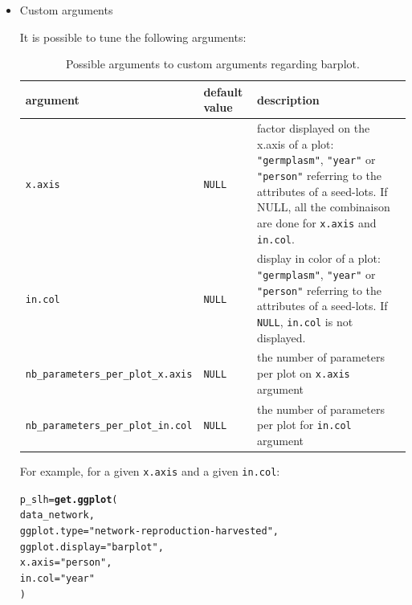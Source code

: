 \documentclass{article}\usepackage[]{graphicx}\usepackage[]{color}
\makeatletter
\newcommand{\hlstr}[1]{\textcolor[rgb]{0.192,0.494,0.8}{#1}}%
\newcommand{\hlstd}[1]{\textcolor[rgb]{0.345,0.345,0.345}{#1}}%
\newcommand{\hlkwb}[1]{\textcolor[rgb]{0.69,0.353,0.396}{#1}}%
\newcommand{\hlkwc}[1]{\textcolor[rgb]{0.333,0.667,0.333}{#1}}%
\newcommand{\hlkwd}[1]{\textcolor[rgb]{0.737,0.353,0.396}{\textbf{#1}}}%
\newenvironment{kframe}{%
 \def\at@end@of@kframe{}%
 \ifinner\ifhmode%
  \def\at@end@of@kframe{\end{minipage}}%
  \begin{minipage}{\columnwidth}%
 \fi\fi%
 \def\FrameCommand##1{\hskip\@totalleftmargin \hskip-\fboxsep
 \colorbox{shadecolor}{##1}\hskip-\fboxsep
     \hskip-\linewidth \hskip-\@totalleftmargin \hskip\columnwidth}%
 \MakeFramed {\advance\hsize-\width
   \@totalleftmargin\z@ \linewidth\hsize
   \@setminipage}}%
 {\par\unskip\endMakeFramed%
 \at@end@of@kframe}
\newenvironment{knitrout}{}{} %
\makeatother
\begin{document}
\begin{itemize}
\begin{center}
\begin{tabular}{cc}
\begin{knitrout}
{}



\end{knitrout}
\\
\end{tabular}
\end{center}

\item Custom arguments

It is possible to tune the following arguments:

\begin{center}
\begin{table}[H]
\begin{tabular}{ p{} p{} p{} }
\hline
argument & default value & description \\
\hline

\texttt{x.axis} & \texttt{NULL} & factor displayed on the x.axis of a plot: \texttt{"germplasm"}, \texttt{"year"} or \texttt{"person"} referring to the attributes of a seed-lots. If NULL, all the combinaison are done for \texttt{x.axis} and \texttt{in.col}. \\
\hline

\texttt{in.col} & \texttt{NULL} & display in color of a plot: \texttt{"germplasm"}, \texttt{"year"} or \texttt{"person"} referring to the attributes of a seed-lots. If \texttt{NULL}, \texttt{in.col} is not displayed. \\
\hline

\texttt{nb\_parameters\_per\_plot\_x.axis} & \texttt{NULL} & the number of parameters per plot on \texttt{x.axis} argument \\
\hline

\texttt{nb\_parameters\_per\_plot\_in.col} & \texttt{NULL} & the number of parameters per plot for \texttt{in.col} argument \\

\hline
\end{tabular}
\caption{Possible arguments to custom arguments regarding barplot.}
\label{custom.barplot}
\end{table}
\end{center}



For example, for a given \texttt{x.axis} and a given \texttt{in.col}:
\begin{knitrout}
\color{fgcolor}\begin{kframe}
\begin{alltt}
\hlstd{p_slh} \hlkwb{=} \hlkwd{get.ggplot}\hlstd{(}
        \hlstd{data_network,}
        \hlkwc{ggplot.type} \hlstd{=} \hlstr{"network-reproduction-harvested"}\hlstd{,}
        \hlkwc{ggplot.display} \hlstd{=} \hlstr{"barplot"}\hlstd{,}
        \hlkwc{x.axis} \hlstd{=} \hlstr{"person"}\hlstd{,}
        \hlkwc{in.col} \hlstd{=} \hlstr{"year"}
        \hlstd{)}
\end{alltt}
\end{kframe}
\end{knitrout}


\end{itemize}
\end{document}
